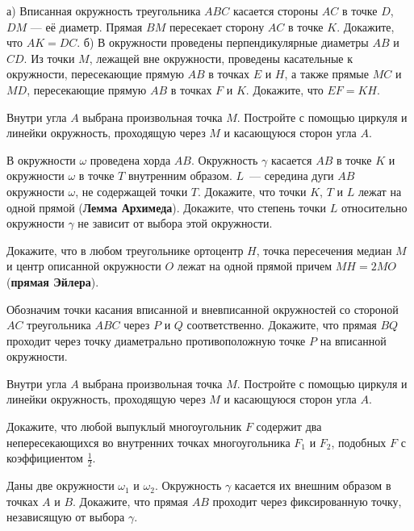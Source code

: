 \iffalse %

\item
а) Вписанная окружность треугольника $ABC$ касается стороны $AC$ в точке $D$,
$DM$ --- её диаметр.
Прямая $BM$ пересекает сторону $AC$ в точке $K$.
Докажите, что $AK = DC$.
б) В окружности проведены перпендикулярные диаметры $AB$ и $CD$.
Из точки $M$, лежащей вне окружности, проведены касательные к окружности,
пересекающие прямую $AB$ в точках $E$ и $H$, а также прямые $MC$ и $MD$,
пересекающие прямую $AB$ в точках $F$ и $K$.
Докажите, что $EF = KH$.

\item
Внутри угла $A$ выбрана произвольная точка $M$.
Постройте с помощью циркуля и линейки окружность, проходящую через $M$ и
касающуюся сторон угла $A$.

\item
В окружности $\omega$ проведена хорда $AB$. Окружность $\gamma$ касается $AB$ в точке $K$ и окружности $\omega$ в точке $T$ внутренним образом. $L$~--- середина дуги $AB$ окружности $\omega$, не содержащей точки $T$.
\sp Докажите, что точки $K$, $T$ и $L$ лежат на одной прямой ({\bf Лемма Архимеда}).
\sp Докажите, что степень точки $L$ относительно окружности $\gamma$ не зависит от выбора этой окружности.


\item
Докажите, что в любом треугольнике ортоцентр $H$, точка пересечения медиан $M$ и центр описанной окружности $O$ лежат на одной прямой причем $MH = 2MO$ ({\bf прямая Эйлера}).

\item
Обозначим точки касания вписанной и вневписанной окружностей со стороной $AC$ треугольника $ABC$ через $P$ и $Q$ соответственно.
Докажите, что прямая $BQ$ проходит через точку диаметрально противоположную точке $P$ на вписанной окружности.

\item
Внутри угла $A$ выбрана произвольная точка $M$.
Постройте с помощью циркуля и линейки окружность, проходящую через $M$ и касающуюся сторон угла $A$.

\item
Докажите, что любой выпуклый многоугольник $F$ содержит два непересекающихся во внутренних точках многоугольника $F_1$ и $F_2$, подобных $F$ с коэффициентом $\frac{1}{2}$.

\item
Даны две окружности $\omega_1$ и $\omega_2$. Окружность $\gamma$ касается их внешним образом в точках $A$ и $B$.
Докажите, что прямая $AB$ проходит через фиксированную точку, независящую от выбора $\gamma$.


